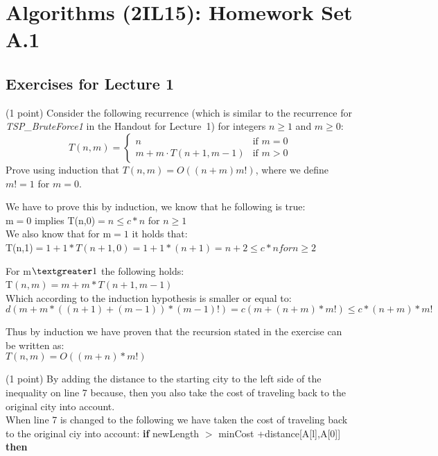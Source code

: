 \documentclass{article}
\title{}
\author{}
\date{}
\renewcommand{\geq}{\geqslant}
\newcounter{rcounter}
\newenvironment{rlist}%
{\begin{list}{A.1-\arabic{rcounter}}{\usecounter{rcounter}}}{\end{list}}
\begin{document}
\section*{Algorithms (2IL15): Homework Set A.1}

\subsection*{Exercises for Lecture 1}
\begin{rlist}
\item (1 point) Consider the following recurrence (which is similar to the recurrence
      for \emph{TSP\_BruteForce1} in the Handout for Lecture~1)
      for integers $n\geq 1$ and $m\geq 0$:
      \[
      T(n,m) = \left\{
                   \begin{array}{ll}
                     n   & \mbox{if $m=0$} \\
                     m + m \cdot T(n+1,m-1)  & \mbox{if $m>0$}
                   \end{array}
                \right.
      \]
      Prove using induction that $T(n,m) = O((n+m)m!)$, where we define $m!=1$ for $m=0$.

We have to prove this by induction, we know that he following is true: \\
m$=0$ implies T(n,0)$=n\le c*n$ for $n\ge 1$ \\

We also know that for m$=1$ it holds that: \\
T(n,1)$=1+1*T(n+1,0)=1+1*(n+1)=n+2 \le c*n for n \ge 2$



For m$\textgreater 1$ the following holds: \\
T$(n,m)=m+m*T(n+1,m-1)$ \\
Which according to the induction hypothesis is smaller or equal to: \\
$d(m+m*((n+1)+(m-1))*(m-1)!)=c(m+(n+m)*m!)\le c*(n+m)*m!$

Thus by induction we have proven that the recursion stated in the exercise can be written as:\\
$T(n,m)=O((m+n)*m!)$

\item (1 point)
By adding the distance to the starting city to the left side of the inequality on line 7 because, then you also take the cost of traveling back to the original city into account. \\

When line 7 is changed to the following we have taken the cost of traveling back to the original ciy into account: \textbf{if} newLength $>$ minCost +distance[A[l],A[0]] \textbf{then}\


\end{rlist}
\end{document}
